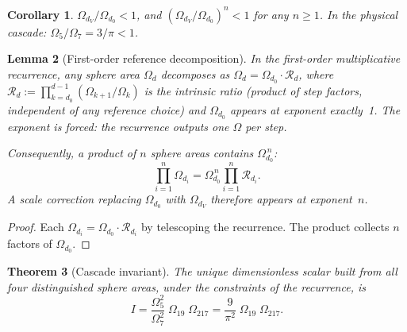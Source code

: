 \documentclass[11pt,a4paper]{article}
\newtheorem{theorem}{Theorem}[section]
\newtheorem{lemma}[theorem]{Lemma}
\newtheorem{corollary}[theorem]{Corollary}
\begin{document}
\begin{corollary}\label{cor:direction}
$\Omega_{d_V}/\Omega_{d_0} < 1$, and $(\Omega_{d_V}/\Omega_{d_0})^n < 1$
for any $n\geq 1$. In the physical cascade: $\Omega_5/\Omega_7 = 3/\pi
< 1$.
\end{corollary}

\begin{lemma}[First-order reference decomposition]\label{lem:bilinear}
In the first-order multiplicative recurrence, any sphere area $\Omega_d$
decomposes as
$\Omega_d = \Omega_{d_0}\cdot\mathcal{R}_d$,
where $\mathcal{R}_d := \prod_{k=d_0}^{d-1}(\Omega_{k+1}/\Omega_k)$ is
the intrinsic ratio (product of step factors, independent of any reference
choice) and $\Omega_{d_0}$ appears at exponent exactly~1. The exponent is
forced: the recurrence outputs one $\Omega$ per step.

Consequently, a product of $n$ sphere areas contains
$\Omega_{d_0}^{\,n}$:
\[
\prod_{i=1}^n \Omega_{d_i}
= \Omega_{d_0}^{\,n}\prod_{i=1}^n \mathcal{R}_{d_i}.
\]
A scale correction replacing $\Omega_{d_0}$ with $\Omega_{d_V}$ therefore
appears at exponent~$n$.
\end{lemma}

\begin{proof}
Each $\Omega_{d_i} = \Omega_{d_0}\cdot\mathcal{R}_{d_i}$ by telescoping
the recurrence. The product collects $n$ factors of $\Omega_{d_0}$.
\end{proof}

\begin{theorem}[Cascade invariant]\label{thm:invariant}
The unique dimensionless scalar built from all four distinguished sphere
areas, under the constraints of the recurrence, is
\[
I = \frac{\Omega_5^2}{\Omega_7^2}\;\Omega_{19}\;\Omega_{217}
= \frac{9}{\pi^2}\;\Omega_{19}\;\Omega_{217}.
\]
\end{theorem}
\end{document}
